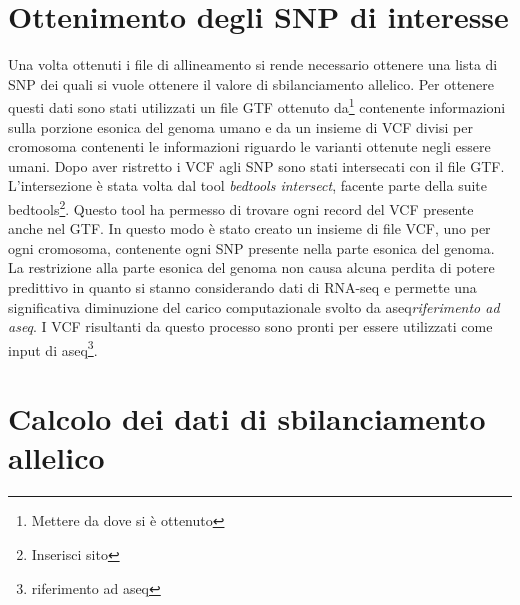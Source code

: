   \section{Ottenimento degli SNP di interesse}
  Una volta ottenuti i file di allineamento si rende necessario ottenere una lista di SNP dei quali si vuole ottenere il valore di sbilanciamento allelico.
  Per ottenere questi dati sono stati utilizzati un file GTF ottenuto da\footnote{Mettere da dove si \`e ottenuto} contenente informazioni sulla porzione esonica del genoma umano e da un insieme di VCF divisi per cromosoma contenenti le informazioni riguardo le varianti ottenute negli essere umani.
  Dopo aver ristretto i VCF agli SNP sono stati intersecati con il file GTF.
  L'intersezione \`e stata volta dal tool \emph{bedtools intersect}, facente parte della suite bedtools\footnote{Inserisci sito}.
  Questo tool ha permesso di trovare ogni record del VCF presente anche nel GTF.
  In questo modo \`e stato creato un insieme di file VCF, uno per ogni cromosoma, contenente ogni SNP presente nella parte esonica del genoma.
  La restrizione alla parte esonica del genoma non causa alcuna perdita di potere predittivo in quanto si stanno considerando dati di RNA-seq e permette una significativa diminuzione del carico computazionale svolto da aseq\emph{riferimento ad aseq}.
  I VCF risultanti da questo processo sono pronti per essere utilizzati come input di aseq\footnote{riferimento ad aseq}.

  \section{Calcolo dei dati di sbilanciamento allelico}
  \label{sec:aseq}
